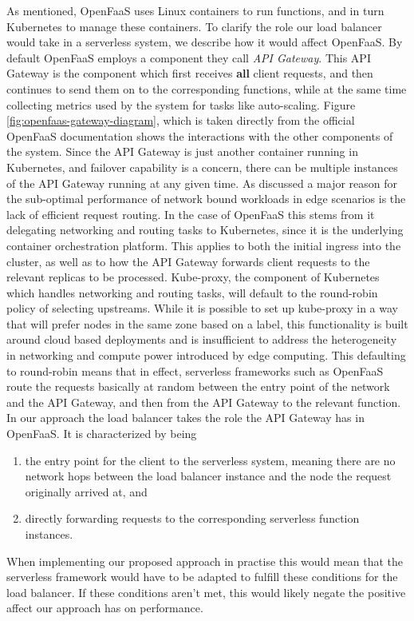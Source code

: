 As mentioned, OpenFaaS uses Linux containers to run functions, and in turn Kubernetes to manage these containers. To clarify the role our load balancer would take in a serverless system, we describe how it would affect OpenFaaS. By default OpenFaaS employs a component they call \textit{API Gateway}. This API Gateway is the component which first receives \textbf{all} client requests, and then continues to send them on to the corresponding functions, while at the same time collecting metrics used by the system for tasks like auto-scaling. Figure \ref{fig:openfaas-gateway-diagram}, which is taken directly from the official OpenFaaS documentation shows the interactions with the other components of the system. Since the API Gateway is just another container running in Kubernetes\cite{kubernetes}, and failover capability is a concern, there can be multiple instances of the API Gateway running at any given time.
As discussed a major reason for the sub-optimal performance of network bound workloads in edge scenarios is the lack of efficient request routing.
In the case of OpenFaaS this stems from it delegating networking and routing tasks to Kubernetes, since it is the underlying container orchestration platform. This applies to both the initial ingress into the cluster, as well as to how the API Gateway forwards client requests to the relevant replicas to be processed. Kube-proxy, the component of Kubernetes which handles networking and routing tasks, will default to the round-robin policy of selecting upstreams. While it is possible to set up kube-proxy in a way that will prefer nodes in the same zone based on a label, this functionality is built around cloud based deployments and is insufficient to address the heterogeneity in networking and compute power introduced by edge computing. This defaulting to round-robin means that in effect, serverless frameworks such as OpenFaaS route the requests basically at random between the entry point of the network and the API Gateway, and then from the API Gateway to the relevant function.\\
In our approach the load balancer takes the role the API Gateway has in OpenFaaS. It is characterized by being
\begin{enumerate}
    \item the entry point for the client to the serverless system, meaning there are no network hops between the load balancer instance and the node the request originally arrived at, and
    \item directly forwarding requests to the corresponding serverless function instances.
\end{enumerate}
When implementing our proposed approach in practise this would mean that the serverless framework would have to be adapted to fulfill these conditions for the load balancer. If these conditions aren't met, this would likely negate the positive affect our approach has on performance.

